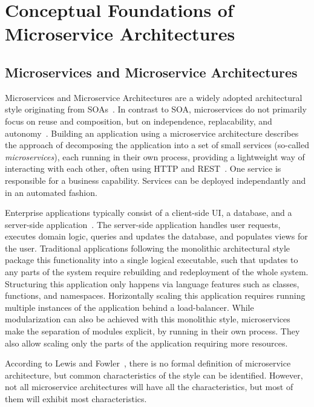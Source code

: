 \section{Conceptual Foundations of Microservice Architectures}\label{sec:foundations}

\subsection{Microservices and Microservice Architectures}

Microservices and Microservice Architectures are a widely adopted architectural style originating from \acp{SOA}~\cite{Mazzara2020}.
In contrast to \ac{SOA}, microservices do not primarily focus on reuse and composition, but on independence, replacability, and autonomy~\cite{Baresi2020}.
Building an application using a microservice architecture describes the approach of decomposing the application into a set of small services (so-called \textit{microservices}), each running in their own process, providing a lightweight way of interacting with each other, often using \ac{HTTP} and \ac{REST}~\cite{Lewis2014}.
One service is responsible for a business capability.
Services can be deployed independantly and in an automated fashion.

Enterprise applications typically consist of a client-side \ac{UI}, a database, and a server-side application~\cite{Lewis2014}.
The server-side application handles user requests, executes domain logic, queries and updates the database, and populates views for the user.
Traditional applications following the monolithic architectural style package this functionality into a single logical executable, such that updates to any parts of the system require rebuilding and redeployment of the whole system.
Structuring this application only happens via language features such as classes, functions, and namespaces.
Horizontally scaling this application requires running multiple instances of the application behind a load-balancer.
While modularization can also be achieved with this monolithic style, microservices make the separation of modules explicit, by running in their own process.
They also allow scaling only the parts of the application requiring more resources.

According to Lewis and Fowler~\cite{Lewis2014}, there is no formal definition of microservice architecture, but common characteristics of the style can be identified.
However, not all microservice architectures will have all the characteristics, but most of them will exhibit most characteristics.

